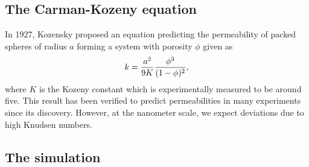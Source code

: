 \subsection{The Carman-Kozeny equation}
In 1927, Kozensky proposed an equation predicting the permeability of packed spheres of radius $a$ forming a system with porosity $\phi$ given as
\begin{align}
	k = {a^2 \over 9K} {\phi^3 \over (1 - \phi)^2},
\end{align}
where $K$ is the Kozeny constant which is experimentally measured to be around five\cite{carman1937fluid}. This result has been verified to predict permeabilities in many experiments since its discovery. However, at the nanometer scale, we expect deviations due to high Knudsen numbers. 
\subsection{The simulation}
